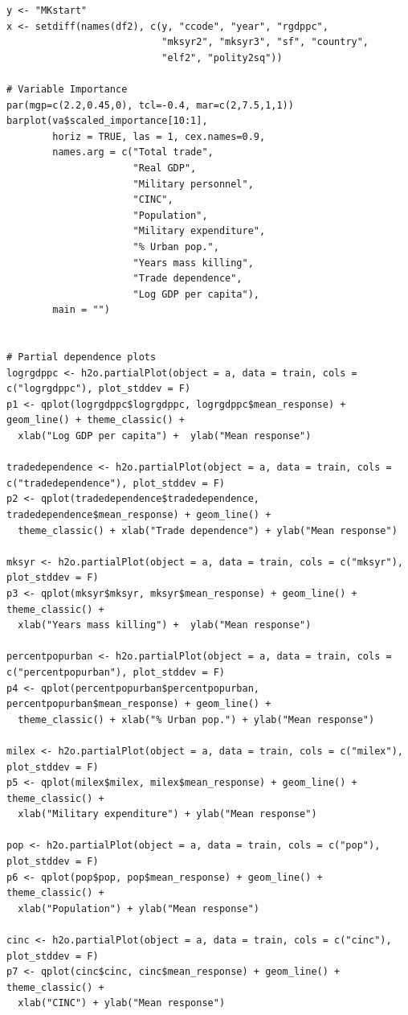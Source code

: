 \documentclass[a4paper,12pt]{article}
\begin{document}
\begin{verbatim}
y <- "MKstart"
x <- setdiff(names(df2), c(y, "ccode", "year", "rgdppc",
                           "mksyr2", "mksyr3", "sf", "country",
                           "elf2", "polity2sq"))  

# Variable Importance
par(mgp=c(2.2,0.45,0), tcl=-0.4, mar=c(2,7.5,1,1))
barplot(va$scaled_importance[10:1],
        horiz = TRUE, las = 1, cex.names=0.9,
        names.arg = c("Total trade",
                      "Real GDP",
                      "Military personnel",
                      "CINC",
                      "Population", 
                      "Military expenditure",
                      "% Urban pop.",
                      "Years mass killing",
                      "Trade dependence", 
                      "Log GDP per capita"),
        main = "")


# Partial dependence plots
logrgdppc <- h2o.partialPlot(object = a, data = train, cols = c("logrgdppc"), plot_stddev = F)
p1 <- qplot(logrgdppc$logrgdppc, logrgdppc$mean_response) + geom_line() + theme_classic() +
  xlab("Log GDP per capita") +  ylab("Mean response")

tradedependence <- h2o.partialPlot(object = a, data = train, cols = c("tradedependence"), plot_stddev = F)
p2 <- qplot(tradedependence$tradedependence, tradedependence$mean_response) + geom_line() +
  theme_classic() + xlab("Trade dependence") + ylab("Mean response")

mksyr <- h2o.partialPlot(object = a, data = train, cols = c("mksyr"), plot_stddev = F)
p3 <- qplot(mksyr$mksyr, mksyr$mean_response) + geom_line() + theme_classic() +
  xlab("Years mass killing") +  ylab("Mean response")

percentpopurban <- h2o.partialPlot(object = a, data = train, cols = c("percentpopurban"), plot_stddev = F)
p4 <- qplot(percentpopurban$percentpopurban, percentpopurban$mean_response) + geom_line() +
  theme_classic() + xlab("% Urban pop.") + ylab("Mean response")

milex <- h2o.partialPlot(object = a, data = train, cols = c("milex"), plot_stddev = F)
p5 <- qplot(milex$milex, milex$mean_response) + geom_line() + theme_classic() +
  xlab("Military expenditure") + ylab("Mean response")

pop <- h2o.partialPlot(object = a, data = train, cols = c("pop"), plot_stddev = F)
p6 <- qplot(pop$pop, pop$mean_response) + geom_line() + theme_classic() +
  xlab("Population") + ylab("Mean response")

cinc <- h2o.partialPlot(object = a, data = train, cols = c("cinc"), plot_stddev = F)
p7 <- qplot(cinc$cinc, cinc$mean_response) + geom_line() + theme_classic() +
  xlab("CINC") + ylab("Mean response")


\end{verbatim}
\end{document}
